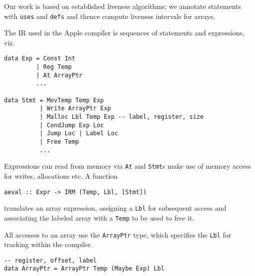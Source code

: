 \documentclass[sigplan,screen]{acmart}
\begin{document}
Our work is based on established liveness algorithms; we annotate statements with {\tt uses} and {\tt defs} and thence compute liveness intervals for arrays.




The IR used in the Apple compiler is sequences of statements and expressions, viz.

\begin{verbatim}
data Exp = Const Int
         | Reg Temp
         | At ArrayPtr
         ...

data Stmt = MovTemp Temp Exp
          | Write ArrayPtr Exp
          | Malloc Lbl Temp Exp -- label, register, size
          | CondJump Exp Loc
          | Jump Loc | Label Loc
          | Free Temp
          ...
\end{verbatim}

Expressions can read from memory via {\tt At} and {\tt Stmt}s make use of memory access for writes, allocations etc. A function

\begin{verbatim}
aeval :: Expr -> IRM (Temp, Lbl, [Stmt])
\end{verbatim}
translates an array expression, assigning a {\tt Lbl} for subsequent access and associating the labeled array with a {\tt Temp} to be used to free it.

All accesses to an array use the {\tt ArrayPtr} type, which specifies the {\tt Lbl} for tracking within the compiler.

\begin{verbatim}
-- register, offset, label
data ArrayPtr = ArrayPtr Temp (Maybe Exp) Lbl
\end{verbatim}
\end{document}
